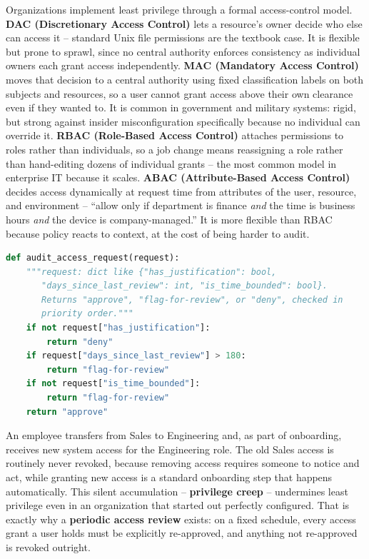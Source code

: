 Organizations implement least privilege through a formal access-control model. \textbf{DAC
(Discretionary Access Control)} lets a resource's owner decide who else can access it -- standard
Unix file permissions are the textbook case. It is flexible but prone to sprawl, since no central
authority enforces consistency as individual owners each grant access independently. \textbf{MAC
(Mandatory Access Control)} moves that decision to a central authority using fixed classification
labels on both subjects and resources, so a user cannot grant access above their own clearance even
if they wanted to. It is common in government and military systems: rigid, but strong against
insider misconfiguration specifically because no individual can override it. \textbf{RBAC
(Role-Based Access Control)} attaches permissions to roles rather than individuals, so a job change
means reassigning a role rather than hand-editing dozens of individual grants -- the most common
model in enterprise IT because it scales. \textbf{ABAC (Attribute-Based Access Control)} decides
access dynamically at request time from attributes of the user, resource, and environment --
``allow only if department is finance \emph{and} the time is business hours \emph{and} the device
is company-managed.'' It is more flexible than RBAC because policy reacts to context, at the cost
of being harder to audit.

\begin{lstlisting}[language=Python, caption={Auditing an access request against least-privilege rules}]
def audit_access_request(request):
    """request: dict like {"has_justification": bool,
       "days_since_last_review": int, "is_time_bounded": bool}.
       Returns "approve", "flag-for-review", or "deny", checked in
       priority order."""
    if not request["has_justification"]:
        return "deny"
    if request["days_since_last_review"] > 180:
        return "flag-for-review"
    if not request["is_time_bounded"]:
        return "flag-for-review"
    return "approve"
\end{lstlisting}

\begin{example}
An employee transfers from Sales to Engineering and, as part of onboarding, receives new system
access for the Engineering role. The old Sales access is routinely never revoked, because removing
access requires someone to notice and act, while granting new access is a standard onboarding step
that happens automatically. This silent accumulation -- \textbf{privilege creep} -- undermines
least privilege even in an organization that started out perfectly configured. That is exactly why
a \textbf{periodic access review} exists: on a fixed schedule, every access grant a user holds must
be explicitly re-approved, and anything not re-approved is revoked outright.
\end{example}

